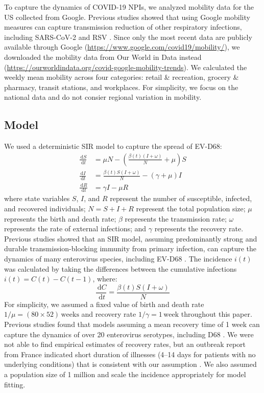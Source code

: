 \documentclass[12pt]{article}
\newcommand{\dd}[1]{\ensuremath{\, \mathrm{d}#1}}
\begin{document}
To capture the dynamics of COVID-19 NPIs, we analyzed mobility data for the US collected from Google.
Previous studies showed that using Google mobility measures can capture transmission reduction of other respiratory infections, including SARS-CoV-2 \citep{nouvellet2021reduction} and RSV \citep{krauer2022estimating}.
Since only the most recent data are publicly available through Google (\url{https://www.google.com/covid19/mobility/}), we downloaded the mobility data from Our World in Data instead (\url{https://ourworldindata.org/covid-google-mobility-trends}).
We calculated the weekly mean mobility across four categories: retail \& recreation, grocery \& pharmacy, transit stations, and workplaces.
For simplicity, we focus on the national data and do not consier regional variation in mobility.

\subsection{Model}

We used a deterministic SIR model to capture the spread of EV-D68:
\begin{align}
\frac{\dd{S}}{\dd{t}} &= \mu N - \left(\frac{\beta(t) (I + \omega)}{N} + \mu\right) S\\
\frac{\dd{I}}{\dd{t}} &= \frac{\beta(t) S (I + \omega)}{N} - (\gamma + \mu) I\\
\frac{\dd{R}}{\dd{t}} &= \gamma I - \mu R
\end{align}
where state variables
$S$, $I$, and $R$ represent the number of susceptible, infected, and recovered individuals;
$N = S + I + R$ represent the total population size;
$\mu$ represents the birth and death rate;
$\beta$ represents the transmission rate;
$\omega$ represents the rate of external infections;
and $\gamma$ represents the recovery rate.
Previous studies showed that an SIR model, assuming predominantly strong and durable
transmission-blocking immunity from primary infection, can capture the dynamics of many enterovirus species, including EV-D68 \citep{pons2018serotype,park2021epidemiological}.
The incidence $i(t)$ was calculated by taking the differences between the cumulative infections $i(t) = C(t) - C(t-1)$, where:
\begin{equation}
\frac{\dd{C}}{\dd{t}} = \frac{\beta(t) S (I + \omega)}{N}
\end{equation}
For simplicity, we assumed a fixed value of birth and death rate $1/\mu = (80\times 52)\,\textrm{weeks}$ and recovery rate $1/\gamma=1\,\textrm{week}$ throughout this paper.
Previous studies found that models assuming a mean recovery time of 1 week can capture the dynamics of over 20 enterovirus serotypes, including D68 \citep{pons2018serotype,park2021epidemiological}.
We were not able to find empirical estimates of recovery rates, but an outbreak report from France indicated short duration of illnesses (4--14 days for patients with no underlying conditions) that is consistent with our assumption \citep{midgley2015emergence}.
We also assumed a population size of 1 million and scale the incidence appropriately for model fitting.
\end{document}
